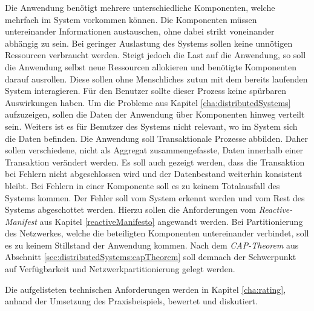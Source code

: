 \begin{enumerate}
    Die Anwendung benötigt mehrere unterschiedliche Komponenten, welche  mehrfach im System vorkommen können. Die Komponenten müssen untereinander Informationen austauschen, ohne dabei strikt voneinander abhängig zu sein.
    Bei geringer Auslastung des Systems sollen keine unnötigen Ressourcen verbraucht werden. Steigt jedoch die Last auf die Anwendung, so soll die Anwendung selbst neue Ressourcen allokieren und benötigte Komponenten darauf ausrollen. Diese sollen ohne Menschliches zutun mit dem bereits laufenden System interagieren. Für den Benutzer sollte dieser Prozess keine spürbaren Auswirkungen haben.
% 
% 
    Um die Probleme aus Kapitel \ref{cha:distributedSystems} aufzuzeigen, sollen die Daten der Anwendung über Komponenten hinweg verteilt sein. Weiters ist es für Benutzer des Systems nicht relevant, wo im System sich die Daten befinden. 
    Die Anwendung soll Transaktionale Prozesse abbilden. Daher sollen verschiedene, nicht als Aggregat zusammengefasste, Daten innerhalb einer Transaktion verändert werden. Es soll auch gezeigt werden, dass die Transaktion bei Fehlern nicht abgeschlossen wird und der Datenbestand weiterhin konsistent bleibt.
% 
% 
    Bei Fehlern in einer Komponente soll es zu keinem Totalausfall des Systems kommen. Der Fehler soll vom System erkennt werden und vom Rest des Systems abgeschottet werden. Hierzu sollen die Anforderungen vom \textit{Reactive-Manifest} aus Kapitel \ref{reactiveManifesto} angewandt werden.
    Bei Partitionierung des Netzwerkes, welche die beteiligten Komponenten untereinander verbindet, soll es zu keinem Stillstand der Anwendung kommen. Nach dem \textit{CAP-Theorem} aus Abschnitt \ref{sec:distributedSystems:capTheorem} soll demnach der Schwerpunkt auf Verfügbarkeit und Netzwerkpartitionierung gelegt werden. 
\end{enumerate}
Die aufgelisteten technischen Anforderungen werden in Kapitel \ref{cha:rating}, anhand der Umsetzung des Praxisbeispiels, bewertet und diskutiert. 

